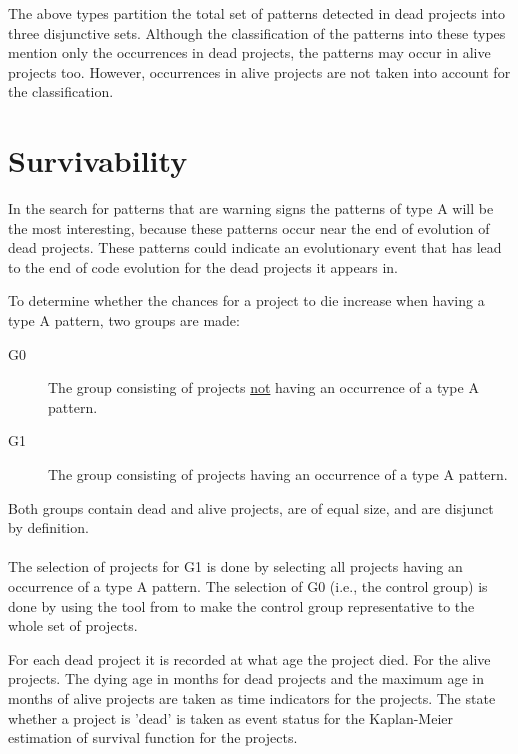 \vspace{1em}
\noindent
The above types partition the total set of patterns detected in dead projects
into three disjunctive sets. Although the classification of the patterns into
these types mention only the occurrences in dead projects, the patterns may
occur in alive projects too. However, occurrences in alive projects are not
taken into account for the classification.

\section{Survivability}
\label{section:survivability}
In the search for patterns that are warning signs the patterns of type A will
be the most interesting, because these patterns occur near the end of evolution
of dead projects. These patterns could indicate an evolutionary event that has
lead to the end of code evolution for the dead projects it appears in.

To determine whether the chances for a project to die increase when having a
type A pattern, two groups are made:
\begin{description}
	\item[G0] \quad The group consisting of projects \underline{not} having an
		occurrence of a type A pattern.
	\item[G1] \quad The group consisting of projects having an occurrence of a type
		A pattern.
\end{description}

\noindent
Both groups contain dead and alive projects, are of equal size, and are
disjunct by definition.

\paragraph{}
The selection of projects for G1 is done by selecting all projects having an
occurrence of a type A pattern. The selection of G0 (i.e., the control group)
is done by using the tool from \citet{nagappan} to make the control group
representative to the whole set of projects.

For each dead project it is recorded at what age the project died. For the
alive projects. The dying age in months for dead projects and the maximum age
in months of alive projects are taken as time indicators for the projects. The
state whether a project is 'dead' is taken as event status for the Kaplan-Meier
estimation of survival function for the projects. 

\begin{comment}
- Execution of the research
- Phases, steps

This chapter reports on the execution of the research method as described in Chapter 3.

If the research has been divided into phases (e.g., using sub questions) the
phases are introduced, reported on and concluded individually. If needed this
Chapter could be split up to balance out the sizes of all Chapters.
An example Research Chapter is provided as Chapter 3 at Paul’s home
page\footnote{http://homepages.cwi.nl/~paulk/thesesMasterSoftwareEngineering/2006/ReneWiegers.pdf}.
\end{comment}
